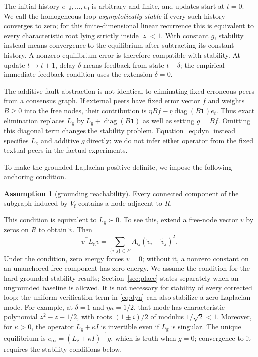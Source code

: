 \documentclass[11pt]{article}
\theoremstyle{definition}
\newtheorem{assumption}{Assumption}
\newcommand{\Lg}{L_{\mathrm g}}
\DeclareMathOperator{\diag}{diag}
\begin{document}
The initial history $e_{-\delta},\ldots,e_0$ is arbitrary and finite, and updates start at $t=0$.
We call the homogeneous loop \emph{asymptotically stable} if every such history converges to zero;
for this finite-dimensional linear recurrence this is equivalent to every characteristic root
lying strictly inside $|z|<1$. With constant $g$, stability instead means convergence to the
equilibrium after subtracting its constant history. A nonzero equilibrium error is therefore
compatible with stability. At update $t\to t+1$, delay $\delta$ means feedback from state
$t-\delta$; the empirical immediate-feedback condition uses the extension $\delta=0$.

The additive fault abstraction is not identical to eliminating fixed erroneous peers from a
consensus graph. If external peers have fixed error vector $f$ and weights $B\ge0$ into the free
nodes, their contribution is $\eta Bf-\eta\diag(B\mathbf1)e_t$. Thus exact elimination replaces
$\Lg$ by $\Lg+\diag(B\mathbf1)$ as well as setting $g=Bf$. Omitting this diagonal term changes
the stability problem. Equation~\eqref{eq:dyn} instead specifies $\Lg$ and additive $g$ directly;
we do not infer either operator from the fixed textual peers in the factual experiments.

To make the grounded Laplacian positive definite, we impose the following anchoring condition.
\begin{assumption}[grounding reachability]\label{ass:reach}
Every connected component of the subgraph induced by $V_{\mathrm f}$ contains a node adjacent to $R$.
\end{assumption}
\noindent This condition is equivalent to $\Lg\succ0$. To see this, extend a free-node vector
$v$ by zeros on $R$ to obtain $\tilde v$. Then
\[
 v^\top\Lg v=\sum_{\{i,j\}\in E} A_{ij}(\tilde v_i-\tilde v_j)^2.
\]
Under the condition, zero energy forces $v=0$; without it, a nonzero constant on an unanchored
free component has zero energy. We assume the condition for the hard-grounded stability results;
Section~\ref{sec:place} states separately when an ungrounded baseline is allowed.
It is not necessary for stability of every corrected loop: the uniform verification term
in \eqref{eq:dyn} can also stabilize a zero Laplacian mode. For example, at $\delta=1$ and
$\eta\kappa=1/2$, that mode has characteristic polynomial $z^2-z+1/2$, with roots
$(1\pm i)/2$ of modulus $1/\sqrt2<1$. Moreover, for $\kappa>0$, the operator $\Lg+\kappa I$
is invertible even if $\Lg$ is singular. The unique equilibrium is
$e_\infty=(\Lg+\kappa I)^{-1}g$, which is truth when $g=0$; convergence to it requires the stability
conditions below.
\end{document}
